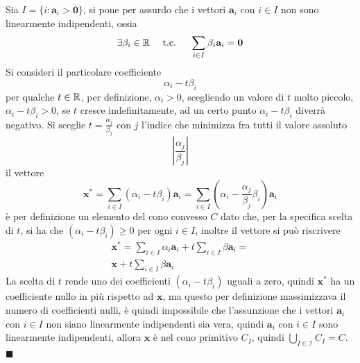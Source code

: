 \documentclass[10pt, letterpaper]{report}
\newcommand{\x}{{\mathbf{x}}}
\begin{document}
Sia $I=\{i : \mathbf a_i>\mathbf 0\}$, si pone per assurdo che i vettori $\mathbf a_i$ con $i\in I$ non sono linearmente indipendenti, ossia 
\begin{equation}
    \exists\beta_i\in\R \ \ \ \text{ t.c. } \ \ \ \sum_{i\in I}\beta_i\mathbf a_i = \mathbf 0
\end{equation}
Si consideri il particolare coefficiente 
$$ \alpha_i-t\beta_i$$
per qualche $t\in {\mathbb R}$, per definizione, $\alpha_i>0$, scegliendo un valore di $t$ molto piccolo, $\alpha_i-t\beta_i>0$, se $t$ cresce indefinitamente, ad un certo punto $\alpha_i-t\beta_i$ diverrà negativo.
Si sceglie $t=\frac{\alpha_j}{\beta_j}$ con $j$ l'indice che minimizza fra tutti il valore assoluto $$ |\frac{\alpha_j}{\beta_j}|$$
il vettore 
$$ \x^*=\sum_{i\in I}(\alpha_i-t\beta_i)\mathbf a_i=\sum_{i\in I}(\alpha_i-\frac{\alpha_j}{\beta_j}\beta_i)\mathbf a_i$$
è per definizione un elemento del cono convesso $C$ dato che, per la specifica scelta di $t$, si ha che $(\alpha_i-t\beta_i)\ge 0$ per ogni $i\in I$, inoltre il vettore si può riscrivere 
\begin{eqnarray*}\x^*=
\sum_{i\in I}\alpha_i\mathbf a_i + t\sum_{i\in I}\beta\mathbf a_i =\\ \x+ t\sum_{i\in I}\beta\mathbf a_i
\end{eqnarray*}
La scelta di $t$ rende uno dei coefficienti $(\alpha_i-t\beta_i)$ uguali a zero, quindi $\x^*$ ha un coefficiente nullo in più rispetto ad $\x$, ma questo per definizione massimizzava il numero di coefficienti nulli, è quindi impossibile che l'assunzione che i vettori $\mathbf a_i$ con $i\in I$ non siano linearmente indipendenti sia vera, quindi 
$\mathbf a_i$ con $i\in I$ sono linearmente indipendenti, allora $\x$ è nel cono primitivo $C_I$, quindi $ 
\bigcup_{I\in\mathcal I}C_I=C
$.\hfill$\blacksquare$
\end{document}
